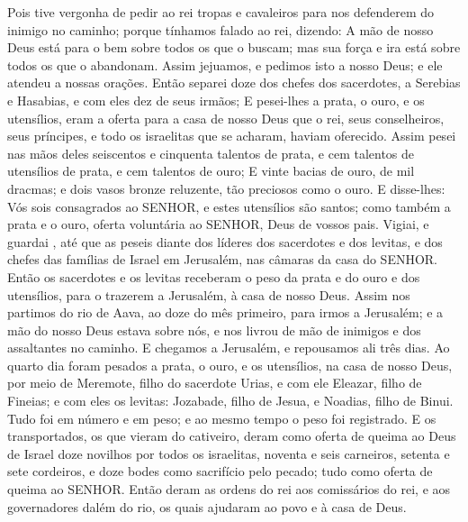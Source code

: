 {Pois tive vergonha de pedir ao rei tropas e cavaleiros para nos defenderem do inimigo no caminho; porque tínhamos falado ao rei, dizendo: A mão de nosso Deus está para o bem sobre todos os que o buscam; mas sua força e ira está sobre todos os que o abandonam.
Assim jejuamos, e pedimos isto a nosso Deus; e ele atendeu a nossas orações.
Então separei doze dos chefes dos sacerdotes, a Serebias e Hasabias, e com eles dez de seus irmãos;
E pesei-lhes a prata, o ouro, e os utensílios,
{} eram a oferta para a casa de nosso Deus que o rei, seus conselheiros, seus príncipes, e todo os israelitas que se acharam, haviam oferecido.
Assim pesei nas mãos deles seiscentos e cinquenta talentos de prata, e cem talentos de utensílios de prata, e cem talentos de ouro;
E vinte bacias de ouro, de mil dracmas; e dois vasos bronze reluzente, tão preciosos como o ouro.
E disse-lhes: Vós sois consagrados ao SENHOR, e estes utensílios são santos; como também a prata e o ouro,
{} oferta voluntária ao SENHOR, Deus de vossos pais.
Vigiai, e guardai
{} , até que as peseis diante dos líderes dos sacerdotes e dos levitas, e dos chefes das famílias de Israel em Jerusalém, nas câmaras da casa do SENHOR.
Então os sacerdotes e os levitas receberam o peso da prata e do ouro e dos utensílios, para o trazerem a Jerusalém, à casa de nosso Deus.
Assim nos partimos do rio de Aava, ao
{} doze do mês primeiro, para irmos a Jerusalém; e a mão do nosso Deus estava sobre nós, e nos livrou de mão de inimigos e dos assaltantes no caminho.
E chegamos a Jerusalém, e repousamos ali três dias.
Ao quarto dia foram pesados a prata, o ouro, e os utensílios, na casa de nosso Deus, por meio de Meremote, filho do sacerdote Urias, e com ele Eleazar, filho de Fineias; e com eles os levitas: Jozabade, filho de Jesua, e Noadias, filho de Binui.
Tudo foi
{} em número e em peso; e ao mesmo tempo o peso foi registrado.
E os transportados, os que vieram do cativeiro,
 deram como oferta de queima ao Deus de Israel doze novilhos por todos os israelitas, noventa e seis carneiros, setenta e sete cordeiros, e doze bodes como sacrifício pelo pecado; tudo
{} como oferta de queima ao SENHOR.
Então deram as ordens do rei aos comissários
 do rei, e aos governadores dalém do rio, os quais ajudaram ao povo e à casa de Deus.

}
